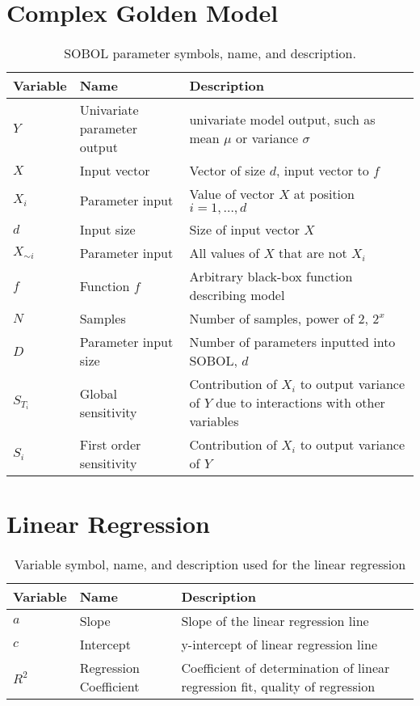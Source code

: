 \section{Complex Golden Model}
\begin{table}[htbp]
    \small %
    \centering
    \begin{tabularx}{\textwidth}{l l X}
        \toprule
        \textbf{Variable} & \textbf{Name} & \textbf{Description} \\
        \midrule
        $Y$ & Univariate parameter output & univariate model output, such as mean $\mu$ or variance $\sigma$ \\
        $X$ & Input vector & Vector of size $d$, input vector to $f$\\
        $X_i$ & Parameter input & Value of vector $X$ at position $i=1, \dots, d$ \\
        $d$ & Input size & Size of input vector $X$\\
        $X_{\sim i}$ & Parameter input & All values of $X$ that are not $X_i$ \\
        $f$ & Function $f$& Arbitrary black-box function describing model \\
        $N$ & Samples & Number of samples, power of 2, $2^x$ \\
        $D$ & Parameter input size & Number of parameters inputted into SOBOL, $d$ \\
        $S_{T_i}$ & Global sensitivity & Contribution of $X_i$ to output variance of $Y$ due to interactions with other variables  \\
        $S_i$ & First order sensitivity & Contribution of $X_i$ to output variance of $Y$ \\
        \bottomrule
    \end{tabularx} \newline
    \caption{SOBOL parameter symbols, name, and description. }
    \label{tab:parameter_table_SOBOL}
\end{table}

\section{Linear Regression}
\begin{table}[htbp]
    \small %
    \centering
    \begin{tabularx}{\textwidth}{l l X}
        \toprule
        \textbf{Variable} & \textbf{Name} & \textbf{Description} \\
        \midrule
        $a$ & Slope & Slope of the linear regression line \\
        $c$ & Intercept & y-intercept of linear regression line\\
        $R^2$ & Regression Coefficient & Coefficient of determination of linear regression fit, quality of regression \\
        \bottomrule
    \end{tabularx}
    \caption{Variable symbol, name, and description used for the linear regression}
    \label{tab:parameter_table_linear_regression}
\end{table}
